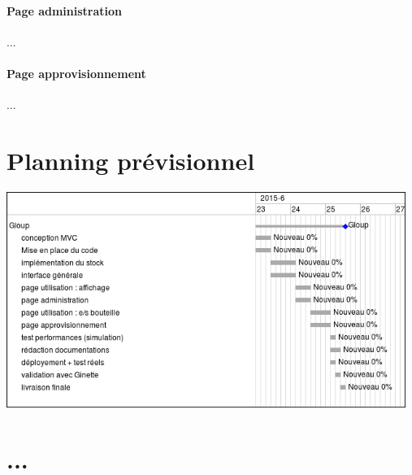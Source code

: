 \documentclass[a4paper,oneside]{article}
\begin{document}
\paragraph{Page administration\\}

...

\paragraph{Page approvisionnement\\}

...





\section{Planning prévisionnel}

\includegraphics[width=13cm]{cdc_gantt.png}


\section{...}



\label{fin}
\end{document}
